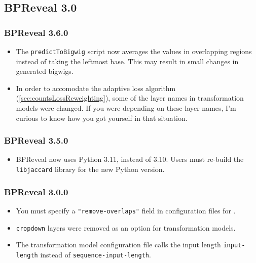 \documentclass{article}
\begin{document}
\subsection{BPReveal 3.0}

\subsubsection{BPReveal 3.6.0}
\begin{itemize}
    \item The \texttt{predictToBigwig} script now averages the values in
        overlapping regions instead of taking the leftmost base.
        This may result in small changes in generated bigwigs.
    \item In order to accomodate the adaptive loss algorithm
        (\ref{sec:countsLossReweighting}), some of the layer names in
        transformation models were changed.
        If you were depending on these layer names, I'm curious to know how you
        got yourself in that situation.
\end{itemize}

\subsubsection{BPReveal 3.5.0}
\begin{itemize}
    \item BPReveal now uses Python 3.11, instead of 3.10. Users must re-build
        the \texttt{libjaccard} library for the new Python version.
\end{itemize}

\subsubsection{BPReveal 3.0.0}
\begin{itemize}
    \item You must specify a \texttt{"remove-overlaps"} field in configuration
        files for .
    \item \texttt{cropdown} layers were removed as an option for transformation
        models.
    \item \begin{sloppypar}The transformation model configuration file calls
        the input length \texttt{input-length} instead of
        \texttt{sequence-input-length}.\end{sloppypar}
\end{itemize}
\end{document}
